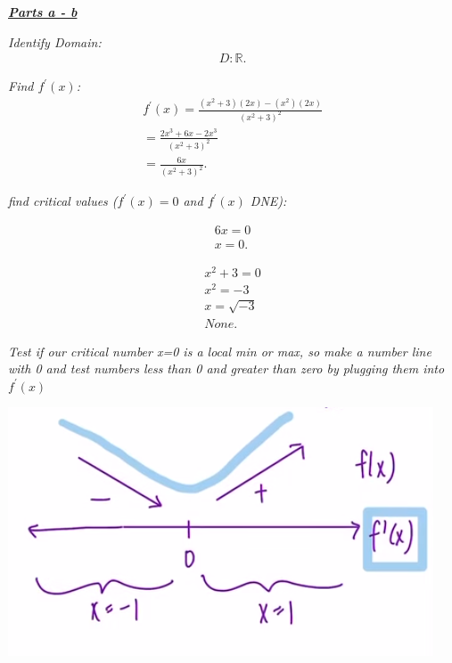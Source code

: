\documentclass{report}
\begin{document}
  \pagebreak \bigbreak \noindent
  \begin{center}
    \textbf{\textit{\underline{Parts a - b}}}
  \end{center}
  \bigbreak \noindent 
  \textit{Identify Domain:}
  \begin{align*}
    D: \mathbb{R}
  .\end{align*}

  \bigbreak \noindent 
  \textit{Find $f^{\prime}(x)$:} 
  \begin{align*}
    f^{\prime}(x) = \frac{(x^{2} +3)(2x) - (x^{2})(2x)}{(x^{2}+3)^{2}} \\
    = \frac{2x^{3}+6x-2x^{3}}{(x^{2}+3)^{2}} \\
    = \frac{6x}{(x^{2}+3)^{2}}
  .\end{align*}

  \bigbreak \noindent 
  \textit{find critical values ($f^{\prime}(x) = 0 $ and $f^{\prime}(x)$ DNE):}

  \begin{align*}
    6x = 0 \\
    \boxed{x = 0}
  .\end{align*}

  \begin{align*}
    x^{2} + 3 = 0 \\
    x^{2} = -3 \\
    x = \sqrt{-3} \\
    \boxed{None}
  .\end{align*}

  \bigbreak \noindent 
  \textit{Test if our critical number x=0 is a local min or max, so make a number line with 0 and test numbers less than 0 and greater than zero by plugging them into $f^{\prime}(x)$}

  \bigbreak \noindent 
  \begin{center}
    \includegraphics[scale=0.7]{ ./images/4.png }
  \end{center}
\end{document}
